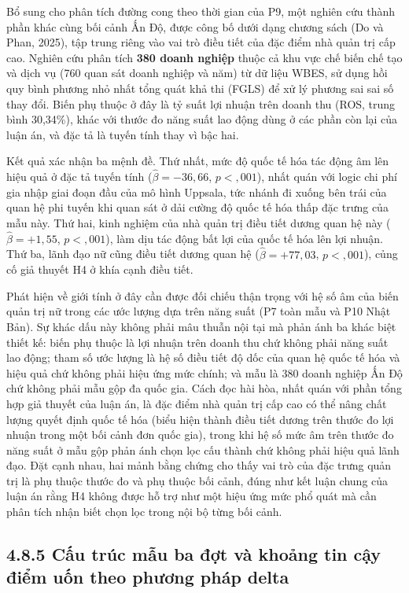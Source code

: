 \documentclass[
  a4paper,
  13pt]{extreport}
\begin{document}
Bổ sung cho phân tích đường cong theo thời gian của P9, một nghiên cứu
thành phần khác cùng bối cảnh Ấn Độ, được công bố dưới dạng chương sách
(Do và Phan, 2025), tập trung riêng vào vai trò điều tiết của đặc điểm
nhà quản trị cấp cao. Nghiên cứu phân tích \textbf{380 doanh nghiệp}
thuộc cả khu vực chế biến chế tạo và dịch vụ (760 quan sát doanh nghiệp
và năm) từ dữ liệu WBES, sử dụng hồi quy bình phương nhỏ nhất tổng quát
khả thi (FGLS) để xử lý phương sai sai số thay đổi. Biến phụ thuộc ở đây
là tỷ suất lợi nhuận trên doanh thu (ROS, trung bình 30,34\%), khác với
thước đo năng suất lao động dùng ở các phần còn lại của luận án, và đặc
tả là tuyến tính thay vì bậc hai.

Kết quả xác nhận ba mệnh đề. Thứ nhất, mức độ quốc tế hóa tác động âm
lên hiệu quả ở đặc tả tuyến tính (\(\hat{\beta} = -36{,}66\),
\(p < {,}001\)), nhất quán với logic chi phí gia nhập giai đoạn đầu của
mô hình Uppsala, tức nhánh đi xuống bên trái của quan hệ phi tuyến khi
quan sát ở dải cường độ quốc tế hóa thấp đặc trưng của mẫu này. Thứ hai,
kinh nghiệm của nhà quản trị điều tiết dương quan hệ này
(\(\hat{\beta} = +1{,}55\), \(p < {,}001\)), làm dịu tác động bất lợi
của quốc tế hóa lên lợi nhuận. Thứ ba, lãnh đạo nữ cũng điều tiết dương
quan hệ (\(\hat{\beta} = +77{,}03\), \(p < {,}001\)), củng cố giả thuyết
H4 ở khía cạnh điều tiết.

Phát hiện về giới tính ở đây cần được đối chiếu thận trọng với hệ số âm
của biến quản trị nữ trong các ước lượng dựa trên năng suất (P7 toàn mẫu
và P10 Nhật Bản). Sự khác dấu này không phải mâu thuẫn nội tại mà phản
ánh ba khác biệt thiết kế: biến phụ thuộc là lợi nhuận trên doanh thu
chứ không phải năng suất lao động; tham số ước lượng là hệ số điều tiết
độ dốc của quan hệ quốc tế hóa và hiệu quả chứ không phải hiệu ứng mức
chính; và mẫu là 380 doanh nghiệp Ấn Độ chứ không phải mẫu gộp đa quốc
gia. Cách đọc hài hòa, nhất quán với phần tổng hợp giả thuyết của luận
án, là đặc điểm nhà quản trị cấp cao có thể nâng chất lượng quyết định
quốc tế hóa (biểu hiện thành điều tiết dương trên thước đo lợi nhuận
trong một bối cảnh đơn quốc gia), trong khi hệ số mức âm trên thước đo
năng suất ở mẫu gộp phản ánh chọn lọc cấu thành chứ không phải hiệu quả
lãnh đạo. Đặt cạnh nhau, hai mảnh bằng chứng cho thấy vai trò của đặc
trưng quản trị là phụ thuộc thước đo và phụ thuộc bối cảnh, đúng như kết
luận chung của luận án rằng H4 không được hỗ trợ như một hiệu ứng mức
phổ quát mà cần phân tích nhận biết chọn lọc trong nội bộ từng bối cảnh.

\hypertarget{cux1ea5u-truxfac-mux1eabu-ba-ux111ux1ee3t-vuxe0-khoux1ea3ng-tin-cux1eady-ux111iux1ec3m-uux1ed1n-theo-phux1b0ux1a1ng-phuxe1p-delta}{%
\subsection{4.8.5 Cấu trúc mẫu ba đợt và khoảng tin cậy điểm uốn theo
phương pháp
delta}\label{cux1ea5u-truxfac-mux1eabu-ba-ux111ux1ee3t-vuxe0-khoux1ea3ng-tin-cux1eady-ux111iux1ec3m-uux1ed1n-theo-phux1b0ux1a1ng-phuxe1p-delta}}
\end{document}
